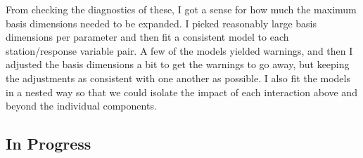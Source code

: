 \documentclass[12pt]{amsart}
\begin{document}
From checking the diagnostics of these, I got a sense for how much the maximum basis dimensions needed to be expanded. I picked reasonably large basis dimensions per parameter and then fit a consistent model to each station/response variable pair. A few of the models yielded warnings, and then I adjusted the basis dimensions a bit to get the warnings to go away, but keeping the adjustments as consistent with one another as possible. I also fit the models in a nested way so that we could isolate the impact of each interaction above and beyond the individual components. 





\subsection{In Progress}
\end{document}

